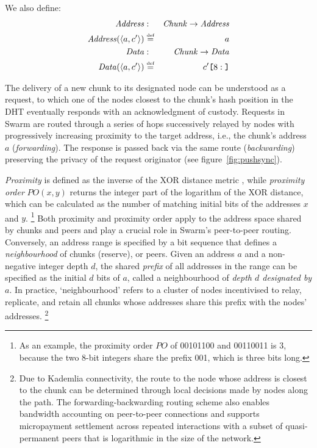 \documentclass[singlecolumn]{acmart}
\newcommand\defeq{\overset{\textrm{\tiny  def}}{=}}
\newcommand{\idx}[1]{\texttt{[}\/#1\/\texttt{]}}
\begin{document}
We also define:
\begin{eqnarray}
\mathit{Address} &:& \mathit{Chunk} \to \mathit{Address} \\
\mathit{Address}(\langle a, c'\rangle) &\defeq& a\\
\mathit{Data} &:& \mathit{Chunk} \to \mathit{Data} \\
\mathit{Data}(\langle a, c'\rangle) &\defeq& c'\idx{8:}
\end{eqnarray}


The delivery of a new chunk to its designated node can be understood as a request, to which one of the nodes closest to the chunk's hash position in the DHT eventually responds with an acknowledgment of custody. Requests in Swarm are routed through a series of hops successively relayed by nodes with progressively increasing proximity to the target address, i.e., the chunk's address $a$ (\emph{forwarding}\/). 
The response is passed back via the same route  (\emph{backwarding}\/) preserving the privacy of the request originator (see figure~\ref{fig:pushsync}).

\emph{Proximity} is defined as the inverse of the XOR distance metric \cite{maymounkov2002kademlia}, while 
\emph{proximity order} $\mathit{PO}(x,y)$ returns the integer part of the logarithm of the XOR distance, which can be calculated as the number of matching initial bits of the addresses $x$ and $y$.%
%
\footnote{As an example, the proximity order $\mathit{PO}$ of 00101100 and 00110011 is 3, because the two 8-bit integers share the prefix 001, which is three bits long. }
%
Both proximity and proximity order apply to the address space shared by chunks and peers and play a crucial role in Swarm's peer-to-peer routing.
Conversely, an address range is specified by a bit sequence that defines a \emph{neighbourhood} of chunks (reserve), or peers. Given an address $a$ and a non-negative integer depth $d$, the shared \emph{prefix} of all addresses in the range can be specified as the initial $d$ bits of $a$, called a neighbourhood of \emph{depth $d$ designated by $a$}. In practice, `neighbourhood' refers to a cluster of nodes incentivised to relay, replicate, and retain all chunks whose addresses share this prefix with the nodes' addresses.%
%
\footnote{Due to Kademlia connectivity, the route to the node whose address is closest to the chunk can be determined through local decisions made by nodes along the path. The forwarding-backwarding routing scheme also enables bandwidth accounting on peer-to-peer connections and supports micropayment settlement across repeated interactions with a subset of quasi-permanent peers that is logarithmic in the size of the network.}
\end{document}
